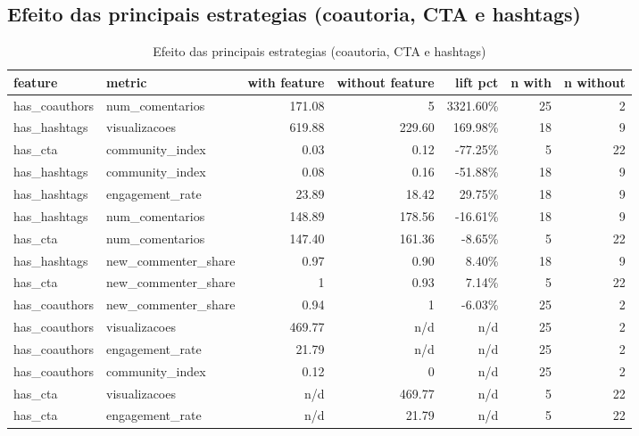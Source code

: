 \documentclass[12pt,a4paper]{article}
\begin{document}
\subsection{Efeito das principais estrategias (coautoria, CTA e hashtags)}
\begin{table}[H]
\centering
\scriptsize
\begin{adjustbox}{max width=\textwidth}
\begin{tabular}{l l r r r r r}
\toprule
feature & metric & with feature & without feature & lift pct & n with & n without \\
\midrule
has\_coauthors & num\_comentarios & 171.08 & 5 & 3321.60\% & 25 & 2 \\
has\_hashtags & visualizacoes & 619.88 & 229.60 & 169.98\% & 18 & 9 \\
has\_cta & community\_index & 0.03 & 0.12 & -77.25\% & 5 & 22 \\
has\_hashtags & community\_index & 0.08 & 0.16 & -51.88\% & 18 & 9 \\
has\_hashtags & engagement\_rate & 23.89 & 18.42 & 29.75\% & 18 & 9 \\
has\_hashtags & num\_comentarios & 148.89 & 178.56 & -16.61\% & 18 & 9 \\
has\_cta & num\_comentarios & 147.40 & 161.36 & -8.65\% & 5 & 22 \\
has\_hashtags & new\_commenter\_share & 0.97 & 0.90 & 8.40\% & 18 & 9 \\
has\_cta & new\_commenter\_share & 1 & 0.93 & 7.14\% & 5 & 22 \\
has\_coauthors & new\_commenter\_share & 0.94 & 1 & -6.03\% & 25 & 2 \\
has\_coauthors & visualizacoes & 469.77 & n/d & n/d & 25 & 2 \\
has\_coauthors & engagement\_rate & 21.79 & n/d & n/d & 25 & 2 \\
has\_coauthors & community\_index & 0.12 & 0 & n/d & 25 & 2 \\
has\_cta & visualizacoes & n/d & 469.77 & n/d & 5 & 22 \\
has\_cta & engagement\_rate & n/d & 21.79 & n/d & 5 & 22 \\
\bottomrule
\end{tabular}
\end{adjustbox}
\caption{Efeito das principais estrategias (coautoria, CTA e hashtags)}
\label{tab:features}
\end{table}
\end{document}
